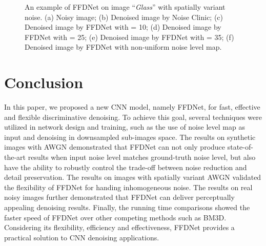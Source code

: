 \documentclass[journal]{IEEEtran}
\begin{document}
\begin{figure*}[!htbp]
\begin{center}
\subfigure[]
{\texttt{[image: 20\_sigma=10.jpg]}}
\subfigure[]
{\texttt{[image: 20\_sigma=25.jpg]}}
\subfigure[]
{\texttt{[image: 20\_sigma=35.jpg]}}
\caption{An example of FFDNet on image ``\emph{Glass}'' with spatially variant noise. (a) Noisy image; (b) Denoised image by Noise Clinic; (c) Denoised image by FFDNet with  = 10; (d) Denoised image by FFDNet with  = 25; (e) Denoised image by FFDNet with  = 35; (f) Denoised image by FFDNet with non-uniform noise level map.}\label{fig_rn4}
\end{center}
\end{figure*}



\section{Conclusion}
\label{sec:conclusion}
In this paper, we proposed a new CNN model, namely FFDNet, for fast, effective and flexible discriminative denoising. To achieve this goal, several techniques were utilized in network design and training, such as the use of noise level map as input and denoising in downsampled sub-images space. The results on synthetic images with AWGN demonstrated that FFDNet can not only produce state-of-the-art results when input noise level matches ground-truth noise level, {but also have the ability to robustly control
the trade-off between noise reduction and detail preservation}. The results on images with spatially variant AWGN validated the flexibility of FFDNet for handing inhomogeneous noise. The results on real noisy images further demonstrated that FFDNet can deliver perceptually appealing denoising results. Finally, the running time comparisons showed the faster speed of FFDNet over other competing methods such as BM3D. Considering its flexibility, efficiency and effectiveness, FFDNet provides a practical solution to CNN denoising applications.







\end{document}
